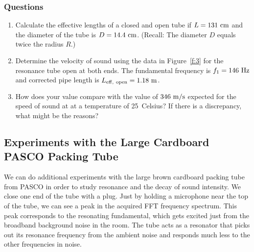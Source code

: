 \documentclass[11pt]{NSF}
\def\ben{\begin{enumerate}}
\def\een{\end{enumerate}}
\def\i{\item{}}
\begin{document}
\subsubsection*{Questions}
\ben
\i Calculate the effective lengths of a closed and open
tube if $L=131~{\rm cm}$ and the diameter of the tube
is $D=14.4~{\rm cm}$.  
(Recall: The diameter  $D$ equals twice the radius $R$.)

\i Determine the velocity of sound using the data in 
Figure~\ref{f:3} for the resonance tube open at both ends.
The fundamental frequency is $f_1 = 146~{\rm Hz}$ and 
corrected pipe length is $L_{\rm eff,\ open}=1.18~{\rm m}$.

\i How does your value compare with the value of 
$346~{\rm m/s}$ expected for the speed of sound at
at a temperature of 25~Celsius?
If there is a discrepancy, what might be the reasons?

\een

\subsection{Experiments with the Large Cardboard PASCO Packing Tube}

We can do additional experiments with the large brown cardboard packing 
tube from PASCO in order to study resonance and the decay of sound intensity. 
We close one end of the tube with a plug. 
Just by holding a microphone near the top of the tube, 
we can see a peak in the acquired FFT frequency spectrum. 
This peak corresponds to the resonating fundamental, which gets excited just from
the broadband background noise in the room. The tube acts as a resonator that
picks out its resonance frequency from the ambient noise and responds much less
to the other frequencies in noise.
\end{document}
